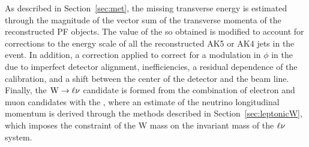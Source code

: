 As described in Section~\ref{sec:met}, the missing transverse energy is estimated through the magnitude of the vector sum of the transverse momenta of the reconstructed PF objects.
The value of the \ETmiss so obtained is modified to account for corrections to the energy scale of all the reconstructed AK5 or AK4 jets in the event.
In addition, a correction applied to correct for a modulation in $\phi$ in the \ptvecmiss due to imperfect detector alignment, inefficiencies, a residual \pt dependence of the calibration, and a shift between the center of the detector and the beam line.\\

Finally, the $\mathrm{W}\to\ell\nu$ candidate is formed from the combination of electron and muon candidates with the \ptvecmiss,
where an estimate of the neutrino longitudinal momentum is derived through the methods described in Section~\ref{sec:leptonicW},
which imposes the constraint of the W mass on the invariant mass of the $\ell\nu$ system.
